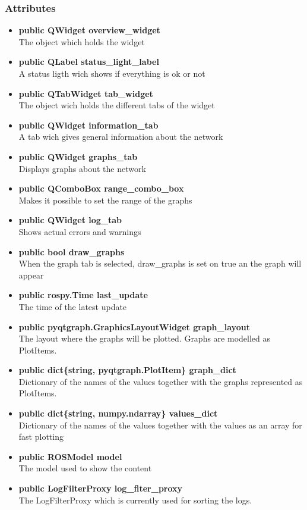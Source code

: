 \subsubsection{Attributes}
\begin{itemize}
  \item \textbf{public QWidget overview\_widget}\\
  The object which holds the widget
  \item \textbf{public QLabel status\_light\_label}\\
  A status ligth wich shows if everything is ok or not
  \item \textbf{public QTabWidget tab\_widget}\\
  The object wich holds the different tabs of the widget
  \item \textbf{public QWidget information\_tab}\\
  A tab wich gives general information about the network 
  \item \textbf{public QWidget graphs\_tab}\\
  Displays graphs about the network
  \item \textbf{public QComboBox range\_combo\_box}\\
  Makes it possible to set the range of the graphs
  \item \textbf{public QWidget log\_tab}\\
  Shows actual errors and warnings
  \item \textbf{public bool draw\_graphs}\\
  When the graph tab is selected, draw\_graphs is set on true an the graph will
  appear
  \item \textbf{public rospy.Time last\_update}\\
  The time of the latest update
  \item \textbf{public pyqtgraph.GraphicsLayoutWidget graph\_layout}\\
  The layout where the graphs will be plotted. Graphs are modelled as PlotItems.
  \item \textbf{public dict\{string, pyqtgraph.PlotItem\} graph\_dict}\\
  Dictionary of the names of the values together with the graphs represented as PlotItems.
  \item \textbf{public dict\{string, numpy.ndarray\} values\_dict}\\
  Dictionary of the names of the values together with the values as an array for fast plotting
  \item \textbf{public ROSModel model}\\
  The model used to show the content
  \item \textbf{public LogFilterProxy log\_fiter\_proxy}\\
  The LogFilterProxy which is currently used for sorting the logs.
  
\end{itemize}
